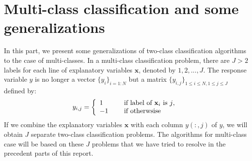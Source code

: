 \documentclass[a4paper,twoside,12pt]{article}
\begin{document}
\begin{center}
\end{center}

\section{Multi-class classification and some generalizations}
In this part, we present some generalizations of two-class classification algorithms to the case of multi-classes. In a multi-class classification problem, there are $J > 2$ labels for each line of explanatory variables $\textbf{x}$, denoted by $1,2,...,J$. The response variable $y$ is no longer a vector $\{y_i\}_{i=1:N}$ but a matrix $\{y_{i,j}\}_{1 \leq i \leq N, 1\leq j \leq J}$ defined by:
\begin{align}
    y_{i,j} = \left\lbrace
    \begin{array}{l l}
    	1 & \quad \text{ if label of $\textbf{x}_i$ is $j$,}\\
    	-1 & \quad \text{ if otherwsise}\\
	\end{array} \right. \notag
\end{align}
If we combine the explanatory variables $\textbf{x}$ with each column $y(:, j)$ of $y$, we will obtain $J$ separate two-class classification problems. The algorithms for multi-class case will be based on these $J$ problems that we have tried to resolve in the precedent parts of this report.
\end{document}
